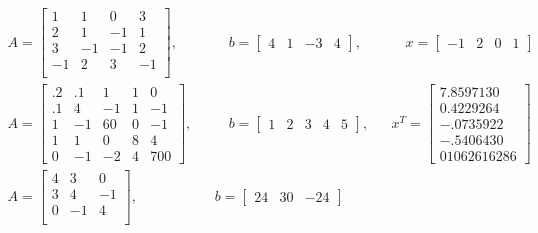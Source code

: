 \documentclass[11pt]{article}	%
\begin{document}
\begin{math}
    \begin{alignedat}{3}
        A = \begin{bmatrix}
                1 & 1 & 0 & 3 \\
                2 & 1 &  -1 & 1 \\
                3 & -1 & -1 & 2 \\
                -1 & 2 & 3 & -1  \\
            \end{bmatrix}
        ,&& \quad
        b = \begin{bmatrix}
                4 & 1 & -3 & 4
            \end{bmatrix}
        ,&& \quad
        x = \begin{bmatrix}
                -1 & 2 & 0 & 1
            \end{bmatrix}\\
        A = \begin{bmatrix}
                .2 & .1 & 1 & 1 & 0 \\
                .1 & 4 & -1 & 1 & -1 \\
                1 & -1 & 60 & 0 & -1 \\
                1 & 1 & 0 & 8 & 4  \\
                0 & -1 & -2 & 4 & 700
            \end{bmatrix}
        ,&& \quad
        b = \begin{bmatrix}
                1 & 2 & 3 & 4 & 5
            \end{bmatrix}
        ,&&
        x^T = \begin{bmatrix}
                7.8597130   \\
                0.4229264  \\
                -.0735922 \\
                -.5406430  \\
                01062616286
            \end{bmatrix}\\
        A = \begin{bmatrix}
                4 & 3 & 0 \\
                3 & 4 & -1 \\
                0 & -1 & 4 \\
            \end{bmatrix}
        ,&&
        b = \begin{bmatrix}
                24 & 30 & -24
            \end{bmatrix}

\end{alignedat}
\end{math}
\end{document}
